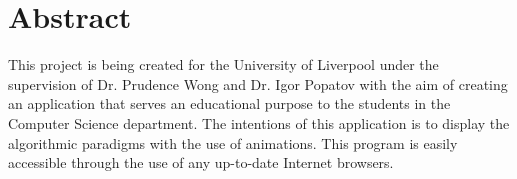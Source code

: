 \section*{Abstract}

This project is being created for the University of Liverpool under the supervision of Dr. Prudence Wong and Dr. Igor Popatov with the aim of creating an application that serves an educational purpose to the students in the Computer Science department. The intentions of this application is to display the algorithmic paradigms with the use of animations. This program is easily accessible through the use of any up-to-date Internet browsers.

